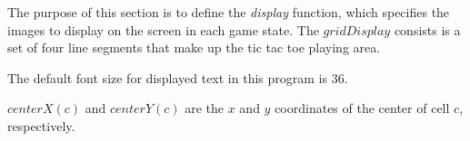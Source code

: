 \documentclass{led_doc}
\begin{document}
\begin{ledDef}
\end{ledDef}

\begin{ledDef}
\end{ledDef}

\begin{ledDef}
\end{ledDef}

\begin{ledCmnt}
The purpose of this section is to define the {\em display} function,
which specifies the images to display on the screen in each game state.
The  $gridDisplay$ consists is a set of four line segments that make up the tic
tac toe playing area.
\end{ledCmnt}

\begin{ledDef}
\end{ledDef}

\begin{ledCmnt}
The default font size for displayed text in this program is 36.
\end{ledCmnt}

\begin{ledDef}
\end{ledDef}

\begin{ledCmnt}
$centerX(c)$ and $centerY(c)$ are the $x$ and $y$ coordinates of the center of cell $c$, respectively.
\end{ledCmnt}

\begin{ledDef}
\end{ledDef}

\begin{ledDef}
\end{ledDef}
\end{document}
